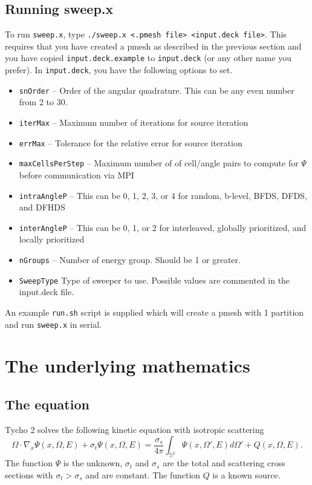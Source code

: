 \documentclass[12pt,letterpaper]{article}
\begin{document}
\subsection{Running sweep.x}
To run {\tt sweep.x}, type {\tt ./sweep.x <.pmesh file> <input.deck file>}.
This requires that you have created a pmesh as described in the previous section and you have copied {\tt input.deck.example} to {\tt input.deck} (or any other name you prefer).
In {\tt input.deck}, you have the following options to set.
\begin{itemize}
\item {\tt snOrder} -- Order of the angular quadrature.  This can be any even number from 2 to 30.
\item {\tt iterMax} -- Maximum number of iterations for source iteration
\item {\tt errMax} -- Tolerance for the relative error for source iteration
\item {\tt maxCellsPerStep} -- Maximum number of of cell/angle pairs to compute for $\Psi$ before communication via MPI
\item {\tt intraAngleP} -- This can be 0, 1, 2, 3, or 4 for random, b-level, BFDS, DFDS, and DFHDS
\item {\tt interAngleP} -- This can be 0, 1, or 2 for interleaved, globally prioritized, and locally prioritized
\item {\tt nGroups} -- Number of energy group.  Should be 1 or greater.
\item {\tt SweepType} Type of sweeper to use.  Possible values are commented in the input.deck file.
\end{itemize}
An example {\tt run.sh} script is supplied which will create a pmesh with 1 partition and run {\tt sweep.x} in serial.










\section{The underlying mathematics}
\subsection{The equation}
Tycho 2 solves the following kinetic equation with isotropic scattering
\begin{equation} \label{eq:main}
\Omega \cdot \nabla_x \Psi(x,\Omega,E) + \sigma_t \Psi(x,\Omega,E) = \frac{\sigma_s}{4\pi} \int_{\mathbb{S}^2} \Psi(x,\Omega',E) d\Omega' + Q(x,\Omega,E).
\end{equation}
The function $\Psi$ is the unknown, $\sigma_t$ and $\sigma_s$ are the total and scattering cross sections with $\sigma_t > \sigma_s$ and are constant.
The function $Q$ is a known source.
\end{document}
